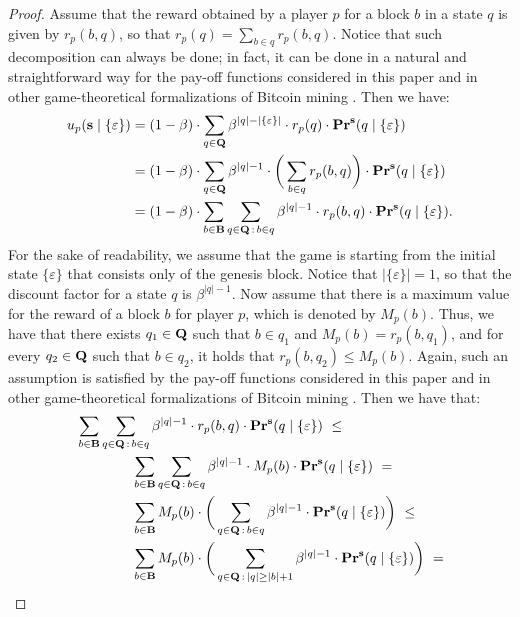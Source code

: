 \begin{proof}
Assume that the reward obtained by a player $p$ for a block $b$ in a state $q$ is given by $r_p(b,q)$, so that $r_p(q) = \sum_{b \in q} r_p(b,q)$. Notice that such decomposition can always be done; in fact, it can be done in a natural and straightforward way for the pay-off functions considered in this paper and in other game-theoretical formalizations of Bitcoin mining \cite{mininggames:2016}. Then we have:
\begin{align*}
u_p(\mathbf{s} \mid \{\varepsilon\}) & =  (1 - \beta) \cdot  \sum_{q \in \mathbf{Q}} \beta^{|q|-|\{\varepsilon\}|} \cdot  r_p(q) \cdot \mathbf{Pr}^{\mathbf{s}}(q \mid \{\varepsilon\})\\
& =  (1 - \beta) \cdot \sum_{q \in \mathbf{Q}} \beta^{|q|-1} \cdot  \bigg(\sum_{b \in q} r_p(b,q) \bigg) \cdot \mathbf{Pr}^{\mathbf{s}}(q \mid \{\varepsilon\})\\
& = (1 - \beta) \cdot \sum_{b \in \mathbf{B}} \sum_{q \in \mathbf{Q} \,:\, b \in q} \beta^{|q|-1} \cdot r_p(b,q) \cdot \mathbf{Pr}^{\mathbf{s}}(q \mid \{\varepsilon\}).
\end{align*}
For the sake of readability, we assume that the game is starting from the initial state $\{\varepsilon\}$ that consists only of the genesis block. Notice that $|\{\varepsilon\}| = 1$, so that the discount factor for a state $q$ is $\beta^{|q|-1}$. Now assume that there is a maximum value for the reward of a block $b$ for player $p$, which is denoted by $M_p(b)$. Thus, we have that there exists $q_1 \in \mathbf{Q}$ such that $b \in q_1$ and $M_p(b) = r_p(b,q_1)$, and for every $q_2 \in \mathbf{Q}$ such that $b \in q_2$, it holds that $r_p(b,q_2) \leq M_p(b)$. Again, such an assumption is satisfied by the pay-off functions considered in this paper and in other game-theoretical formalizations of Bitcoin mining \cite{mininggames:2016}. Then we have that:
\begin{align*}
&\sum_{b \in \bB} \sum_{q \in \bQ \,:\, b \in q} \beta^{|q|-1} \cdot r_p(b,q) \cdot \pr^{\bs}(q \mid \{\varepsilon\})
\ \leq \\
&\hspace{40pt}  \sum_{b \in \bB} \sum_{q \in \bQ \,:\, b \in q} \beta^{|q|-1} \cdot M_p(b) \cdot \pr^{\bs}(q \mid \{\varepsilon\}) \ =\\
&\hspace{40pt}  \sum_{b \in \bB} M_p(b) \cdot\bigg(\sum_{q \in \bQ \,:\, b \in q} \beta^{|q|-1}  \cdot \pr^{\bs}(q \mid \{\varepsilon\})\bigg) \ \leq\\
&\hspace{40pt}  \sum_{b \in \bB} M_p(b) \cdot\bigg(\sum_{q \in \bQ \,:\, |q| \geq |b|+1} \beta^{|q|-1}  \cdot \pr^{\bs}(q \mid \{\varepsilon\})\bigg) \ = \\

\end{align*}
\end{proof}
